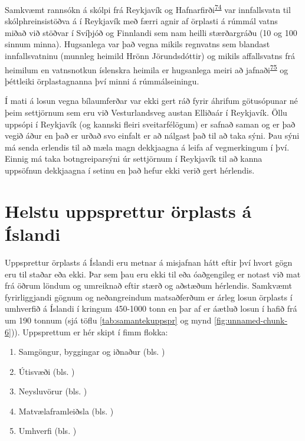 \documentclass[icelandic,]{book}
\providecommand{\tightlist}{%
  \setlength{\itemsep}{0pt}\setlength{\parskip}{0pt}}
\begin{document}
Samkvæmt rannsókn á skólpi frá Reykjavík og Hafnarfirði\textsuperscript{\protect\hyperlink{ref-magnusson2016microlitter}{74}} var innfallsvatn til skólphreinsistöðva á í Reykjavík með færri agnir af örplasti á rúmmál vatns miðað við stöðvar í Svíþjóð og Finnlandi sem nam heilli stærðargráðu (10 og 100 sinnum minna). Hugsanlega var það vegna mikils regnvatns sem blandast innfallsvatninu (munnleg heimild Hrönn Jörundsdóttir) og mikils affallsvatns frá heimilum en vatnsnotkun íslenskra heimila er hugsanlega meiri að jafnaði\textsuperscript{\protect\hyperlink{ref-Pakula2010}{75}} og þéttleiki örplastagnanna því minni á rúmmálseiningu.

Í mati á losun vegna bílaumferðar var ekki gert ráð fyrir áhrifum götusópunar né þeim settjörnum sem eru við Vesturlandsveg austan Elliðaár í Reykjavík. Öllu uppsópi í Reykjavík (og kannski fleiri sveitarfélögum) er safnað saman og er það vegið áður en það er urðað svo einfalt er að nálgast það til að taka sýni. Þau sýni má senda erlendis til að mæla magn dekkjaagna á leifa af vegmerkingum í því. Einnig má taka botngreiparsýni úr settjörnum í Reykjavík til að kanna uppsöfnun dekkjaagna í setinu en það hefur ekki verið gert hérlendis.

\hypertarget{helstu-uppsprettur-orplasts-a-islandi}{%
\chapter{Helstu uppsprettur örplasts á Íslandi}\label{helstu-uppsprettur-orplasts-a-islandi}}

Uppsprettur örplasts á Íslandi eru metnar á misjafnan hátt eftir því hvort gögn eru til staðar eða ekki. Þar sem þau eru ekki til eða óaðgengileg er notast við mat frá öðrum löndum og umreiknað eftir stærð og aðstæðum hérlendis. Samkvæmt fyrirliggjandi gögnum og neðangreindum matsaðferðum er árleg losun örplasts í umhverfið á Íslandi í kringum 450-1000 tonn en þar af er áætluð losun í hafið frá um 190 tonnum (sjá töflu \ref{tab:samantekuppspr} og mynd \ref{fig:unnamed-chunk-6})). Uppsprettum er hér skipt í fimm flokka:


\begin{enumerate}
\def\labelenumi{\arabic{enumi}.}
\tightlist
\item
Samgöngur, byggingar og iðnaður (bls. \pageref{samgongur-byggingar-og-inaur})
\item
  Útisvæði (bls. \pageref{utisvi})
\item
  Neysluvörur (bls. \pageref{neysluvara})
\item
  Matvælaframleiðsla (bls. \pageref{matvlaframleisla})
\item
  Umhverfi (bls. \pageref{umhverfi})
\end{enumerate}
\end{document}
